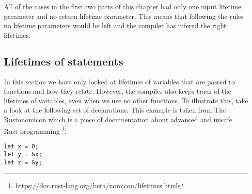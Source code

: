 All of the cases in the first two parts of this chapter had only one input lifetime parameter and no return lifetime parameter. This means that following the rules no lifetime parameters would be left and the compiler has infered the right lifetimes. 



%    

\subsection{Lifetimes of statements}\label{desugar}
In this section we have only looked at lifetimes of variables that are passed to functions and how they relate. However, the compiler also keeps track of the lifetimes of variables, even when we use no other functions. To illustrate this, take a look at the following set of declarations. This example is taken from The Rustonomicon which is a piece of documentation about advanced and unsafe Rust programming \footnote{https://doc.rust-lang.org/beta/nomicon/lifetimes.html}.

\begin{verbatim}
let x = 0;
let y = &x;
let z = &y;
\end{verbatim}

